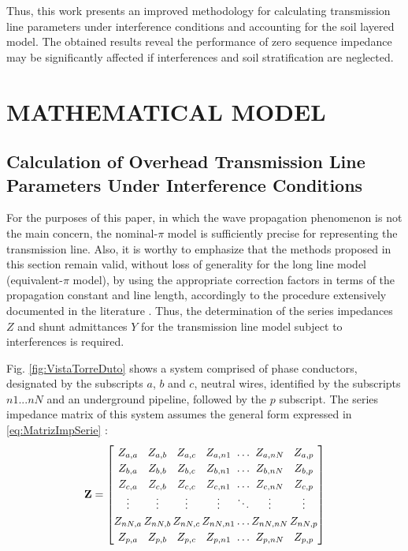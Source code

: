 \documentclass[conference]{IEEEtran}
\begin{document}
Thus, this work presents an improved methodology for calculating transmission line parameters under interference conditions and accounting for the soil layered model. The obtained results reveal the performance of zero sequence impedance may be significantly affected if interferences and soil stratification are neglected. 


\section{MATHEMATICAL MODEL}
\subsection{Calculation of Overhead Transmission Line Parameters Under Interference Conditions}
For the purposes of this paper, in which the wave propagation phenomenon is not the main concern, the nominal-$\pi$ model is sufficiently precise for representing the transmission line. Also, it is worthy to emphasize that the methods proposed in this section remain valid, without loss of generality for the long line model (equivalent-$\pi$ model), by using the appropriate correction factors in terms of the propagation constant and line length, accordingly to the procedure extensively documented in the literature \cite{Saadat1999,Stevenson1994}. Thus, the determination of the series impedances $Z$ and shunt admittances $Y$ for the transmission line model subject to interferences is required.

Fig. \ref{fig:VistaTorreDuto} shows a system comprised of phase conductors, designated by the subscripts $a$, $b$ and $c$, neutral wires, identified by the subscripts $n1...nN$ and an underground pipeline,  followed by the $p$ subscript. The series impedance matrix of this system assumes the general form expressed in \eqref{eq:MatrizImpSerie} \cite{Stevenson1994}:
\begin{equation}\label{eq:MatrizImpSerie}
	\arraycolsep=0.8pt %
	\medmuskip = -2mu %
	\def\arraystretch{1.2}
	\mathbf{Z}
	=
	\begin{bmatrix}
		Z_{a,a} & Z_{a,b} & Z_{a,c} & Z_{a,n1} & \ldots & Z_{a,nN} & Z_{a,p}  \\
		Z_{b,a} & Z_{b,b} & Z_{b,c} & Z_{b,n1} & \ldots & Z_{b,nN} & Z_{b,p}  \\
		Z_{c,a} & Z_{c,b} & Z_{c,c} & Z_{c,n1} & \ldots & Z_{c,nN} & Z_{c,p}  \\
		\vdots & \vdots & \vdots & \vdots & \ddots & \vdots & \vdots  \\
		Z_{nN,a} & Z_{nN,b} & Z_{nN,c} & Z_{nN,n1} & \ldots & Z_{nN,nN} & Z_{nN,p}  \\
		Z_{p,a} & Z_{p,b} & Z_{p,c} & Z_{p,n1} & \ldots & Z_{p,nN} & Z_{p,p}  \\
	\end{bmatrix}
\end{equation}
\end{document}
